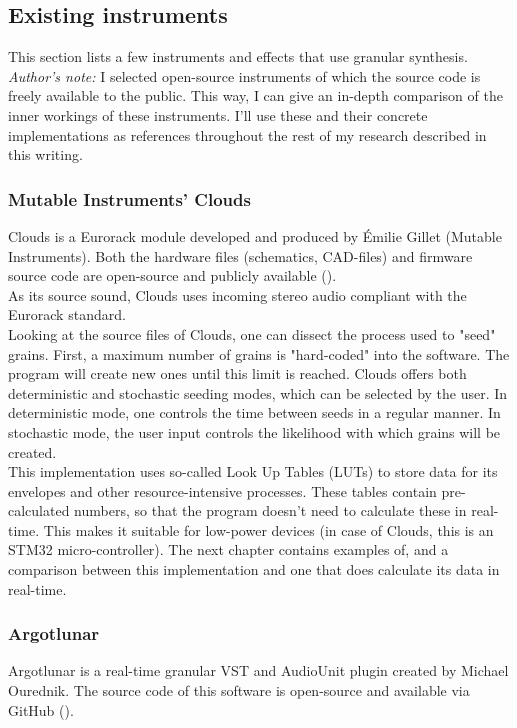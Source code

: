 \documentclass[10pt, twocolumn]{IEEEtran}
\begin{document}
\subsection{Existing instruments}
This section lists a few instruments and effects that use granular synthesis. \\
\textit{Author's note:} I selected open-source instruments of which the source code is freely available to the public. This way, I can give an in-depth comparison of the inner workings of these instruments. I'll use these and their concrete implementations as references throughout the rest of my research described in this writing.

\subsubsection{Mutable Instruments' Clouds}
Clouds is a Eurorack module developed and produced by Émilie Gillet (Mutable Instruments). Both the hardware files (schematics, CAD-files) and firmware source code are open-source and publicly available (\cite{clouds}).\\
As its source sound, Clouds uses incoming stereo audio compliant with the Eurorack standard.\\
Looking at the source files of Clouds, one can dissect the process used to "seed" grains. First, a maximum number of grains is "hard-coded" into the software. The program will create new ones until this limit is reached. Clouds offers both deterministic and stochastic seeding modes, which can be selected by the user. In deterministic mode, one controls the time between seeds in a regular manner. In stochastic mode, the user input controls the likelihood with which grains will be created.\\
This implementation uses so-called Look Up Tables (LUTs) to store data for its envelopes and other resource-intensive processes. These tables contain pre-calculated numbers, so that the program doesn't need to calculate these in real-time. This makes it suitable for low-power devices (in case of Clouds, this is an STM32 micro-controller). The next chapter contains examples of, and a comparison between this implementation and one that does calculate its data in real-time.

\subsubsection{Argotlunar}
Argotlunar is a real-time granular VST and AudioUnit plugin created by Michael Ourednik. The source code of this software is open-source and available via GitHub (\cite{argotlunar}).
\end{document}
